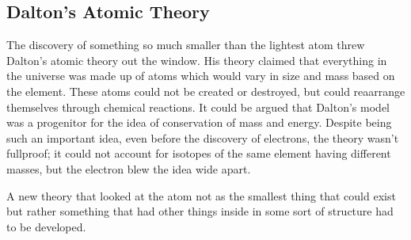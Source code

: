 \subsection{Dalton's Atomic Theory}

The discovery of something so much smaller than the lightest atom threw Dalton's atomic theory out the window.
His theory claimed that  everything in the universe was made up of atoms which would vary in size and mass based on the element.
These atoms could not be created or destroyed, but  could reaarrange themselves through chemical reactions.
It could be argued that Dalton's model was a progenitor for the idea of conservation of mass and energy.
Despite being such an important idea, even before the discovery of electrons, the theory wasn't fullproof; it could not account for isotopes of the same element having different masses, but the electron blew the idea wide apart.

A new theory that looked at the atom not as the smallest thing that could exist but rather something that had other things inside in some sort of structure had to be developed.
